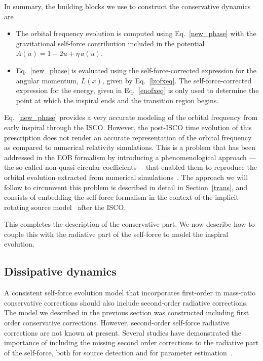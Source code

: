 In summary, the building blocks we use to construct the conservative dynamics are

\begin{itemize}
\item The orbital frequency evolution is computed using Eq.~\eqref{new_phase} with the gravitational self-force contribution included in the potential \(A(u)= 1-2u + \eta\, a(u)\).
\item Eq.~\eqref{new_phase} is evaluated using the self-force-corrected expression for the angular momentum, \(L(x)\), given by Eq.~\eqref{lzofxeq}. The self-force-corrected expression for the energy, given in Eq.~\eqref{enofxeq} is only used to determine the point at which the inspiral ends and the transition region begins.
\end{itemize}

Eq.~\eqref{new_phase} provides a very accurate modeling of the orbital frequency from early inspiral through the ISCO. However, the post-ISCO time evolution of this prescription does not render an accurate representation of the orbital frequency as compared to numerical relativity simulations. This is a problem that has been addressed in the EOB formalism by introducing a phenomenological approach ---the so-called non-quasi-circular coefficients--- that enabled them to reproduce the orbital evolution extracted from numerical simulations~\cite{BuonannoEOBv2Main}. The approach we will follow to circumvent this problem is described in detail in Section~\ref{trans}, and consists of embedding the self-force formalism in the context of the implicit rotating source model~\cite{Baker:2008} after the ISCO.

This completes the description of the conservative part. We now describe how to couple this with the radiative part of the self-force to model the inspiral evolution. 
 
 \subsection{Dissipative dynamics}

A consistent self-force evolution model that incorporates first-order in mass-ratio conservative  corrections should also include second-order radiative corrections. The model we described in the previous section was constructed including first order conservative corrections. However, second-order self-force radiative corrections are not known at present. Several studies have demonstrated the importance of including the missing second order corrections to the radiative part of the self-force, both for source detection and for parameter estimation~\cite{Isoyama:2013, Burko:2012, Huerta:2012, Huerta:2010, Huerta:2009}. 

